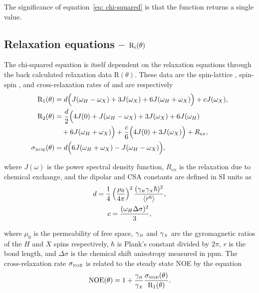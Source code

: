 The significance of equation~\eqref{eq: chi-squared} is that the function returns a single value.


\subsection{Relaxation equations -- $\mathrm{R}_i(\theta)$}

The chi-squared equation is itself dependent on the relaxation equations through the back calculated relaxation data R$(\theta)$.  These data are the spin-lattice  , spin-spin , and cross-relaxation rates of \citet{Abragam61} and are respectively
\begin{align}
 \mathrm{R}_1(\theta) &= d \Big( J(\omega_H - \omega_X) + 3J(\omega_X) + 6J(\omega_H + \omega_X) \Big) + cJ(\omega_X),     \label{eq: R1} \\
 \mathrm{R}_2(\theta) &= \frac{d}{2} \Big( 4J(0) + J(\omega_H - \omega_X) + 3J(\omega_X) + 6J(\omega_H)                    \nonumber \\
     &  \quad + 6J(\omega_H + \omega_X) \Big) + \frac{c}{6} \Big( 4J(0) + 3J(\omega_X) \Big) + R_{ex},              \label{eq: R2} \\  
 \sigma_{\scriptscriptstyle \mathrm{NOE}}(\theta) &= d \Big( 6J(\omega_H + \omega_X) - J(\omega_H - \omega_X) \Big),                              \label{eq: sigma_NOE}
\end{align}

\noindent where $J(\omega)$ is the power spectral density function, $R_{ex}$ is the relaxation due to chemical exchange, and the dipolar and CSA constants are defined in SI units as
\begin{gather}
 d = \frac{1}{4} \left(\frac{\mu_0}{4\pi}\right)^2 \frac{(\gamma_{\scriptscriptstyle H} \gamma_{\scriptscriptstyle X} \hbar)^2}{\langle r^6 \rangle}, \label{eq: dipolar constant} \\
 c = \frac{(\omega_H \Delta\sigma)^2}{3}, \label{eq: CSA constant}
\end{gather}

\noindent where $\mu_0$ is the permeability of free space, $\gamma_{\scriptscriptstyle H}$ and $\gamma_{\scriptscriptstyle X}$ are the gyromagnetic ratios of the $H$ and $X$ spins respectively, $\hbar$ is Plank's constant divided by $2\pi$, $r$ is the bond length, and $\Delta\sigma$ is the chemical shift anisotropy measured in ppm.  The cross-relaxation rate $\sigma_{\scriptscriptstyle \mathrm{NOE}}$  is related to the steady state NOE by the equation
\begin{equation} \label{eq: NOE}
 \mathrm{NOE}(\theta) = 1 + \frac{\gamma_{\scriptscriptstyle H}}{\gamma_{\scriptscriptstyle X}} \frac{\sigma_{\scriptscriptstyle \mathrm{NOE}}(\theta)}{\mathrm{R}_1(\theta)}.
\end{equation}



